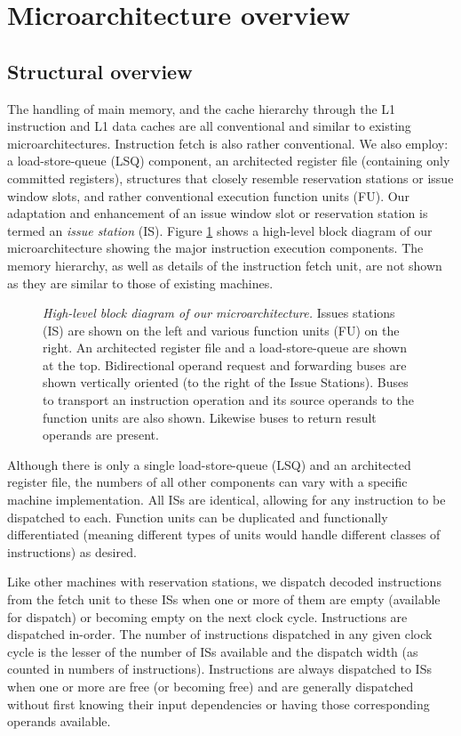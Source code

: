 \documentclass[10pt,dvips]{article}
\begin{document}
\section{Microarchitecture overview}
%
\subsection{Structural overview}
%
The handling of main memory, and the cache hierarchy 
through the L1 instruction and L1 data caches are all
conventional and similar to existing microarchitectures.
Instruction fetch is also rather conventional.
We also employ: a
load-store-queue (LSQ) component, an architected register file
(containing only committed registers),
structures that closely resemble reservation stations or issue
window slots,
and rather conventional execution function units (FU).
Our adaptation and enhancement of an issue window slot or reservation 
station is termed
an \textit{issue station} (IS).
Figure \ref{fig:overview} shows a high-level block diagram
of our microarchitecture showing the major instruction execution components.
The memory hierarchy, as well as details of the instruction fetch
unit, are not shown as they are similar to those of existing
machines.
%
\begin{figure}
\centering
{}
\caption{{\em High-level block diagram of our microarchitecture.} 
\small{
Issues stations (IS) are shown on the left and various function
units (FU) on the right.  An architected register file and a
load-store-queue are shown at the top.
Bidirectional operand request and forwarding buses are shown
vertically oriented (to the right of the Issue Stations).
Buses to transport an instruction operation and its source operands
to the function units are also shown. 
Likewise buses to return result operands are present.
}
}
\label{fig:overview}
\end{figure}
%
Although there is only a single load-store-queue (LSQ) and
an architected register file,
the numbers of all other components can
vary with a specific machine implementation.
All ISs are identical, allowing for any
instruction to be dispatched to each.
Function units can be duplicated and functionally differentiated (meaning
different types of units would handle different classes of instructions)
as desired.

Like other machines with reservation stations, we dispatch 
decoded instructions from the fetch unit to these ISs
when one or more of them are empty (available for dispatch) or 
becoming empty on the next clock cycle.  
Instructions are dispatched in-order.
The number of instructions dispatched in any 
given clock cycle is
the lesser of the number of ISs available and the
dispatch width (as counted in numbers of instructions).
Instructions are always dispatched to ISs when
one or more are free (or becoming free) and are generally dispatched
without first knowing their input dependencies or having those
corresponding operands available.
\end{document}
